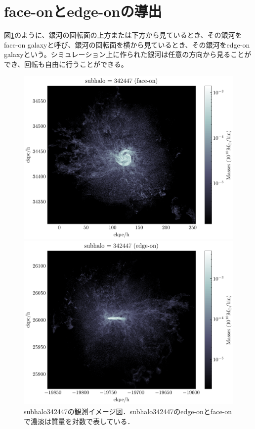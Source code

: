 \section{face-onとedge-onの導出}
図\ref{fig:faceon,edge-on}のように、銀河の回転面の上方または下方から見ているとき、その銀河をface-on galaxyと呼び、銀河の回転面を横から見ているとき、その銀河をedge-on galaxyという。シミュレーション上に作られた銀河は任意の方向から見ることができ、回転も自由に行うことができる。

\begin{figure}[htbp]
	\centering
	\begin{minipage}[b]{0.48\linewidth}
		\centering
		\includegraphics[width=\linewidth]{./pic/face-on}
	\end{minipage}
	\begin{minipage}[b]{0.48\linewidth}
		\centering
		\includegraphics[width=\linewidth]{./pic/edge-on}
	\end{minipage}
	\caption{subhalo342447の観測イメージ図．subhalo342447のedge-onとface-onで濃淡は質量を対数で表している．}
	\label{fig:faceon,edge-on}
\end{figure}


